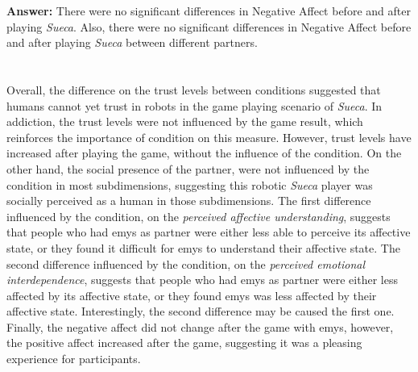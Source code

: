 \textbf{Answer:} There were no significant differences in Negative Affect before and after playing \emph{Sueca}.
Also, there were no significant differences in Negative Affect before and after playing \emph{Sueca} between different partners.

\section*{\centering*}

Overall, the difference on the trust levels between conditions suggested that humans cannot yet trust in robots in the game playing scenario of \emph{Sueca}.
In addiction, the trust levels were not influenced by the game result, which reinforces the importance of condition on this measure.
However, trust levels have increased after playing the game, without the influence of the condition.
On the other hand, the social presence of the partner, were not influenced by the condition in most subdimensions, suggesting this robotic \emph{Sueca} player was socially perceived as a human in those subdimensions.
The first difference influenced by the condition, on the \emph{perceived affective understanding}, suggests that people who had \ac{emys} as partner were either less able to perceive its affective state, or they found it difficult for \ac{emys} to understand their affective state.
The second difference influenced by the condition, on the \emph{perceived emotional interdependence}, suggests that people who had \ac{emys} as partner were either less affected by its affective state, or they found \ac{emys} was less affected by their affective state.
Interestingly, the second difference may be caused the first one.
Finally, the negative affect did not change after the game with \ac{emys}, however, the positive affect increased after the game, suggesting it was a pleasing experience for participants.

\clearpage
